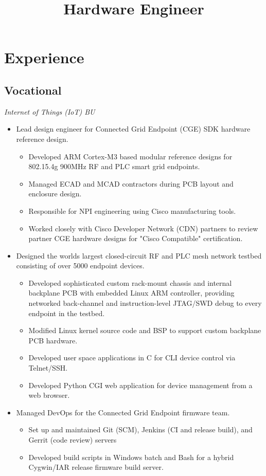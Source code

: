 \documentclass[11pt,a4paper]{moderncv}
\title{Hardware Engineer}
\begin{document}
\makecvtitle

\section{Experience}
\subsection{Vocational}
{
  \textit{Internet of Things (IoT) BU}
  \begin{itemize}
  \item Lead design engineer for Connected Grid Endpoint (CGE) SDK hardware reference design.
    \begin{itemize}
      \item Developed ARM Cortex-M3 based modular reference designs for 802.15.4g 900MHz RF and PLC smart grid endpoints.
      \item Managed ECAD and MCAD contractors during PCB layout and enclosure design.
      \item Responsible for NPI engineering using Cisco manufacturing tools.
      \item Worked closely with Cisco Developer Network (CDN) partners to review partner CGE hardware designs for "Cisco Compatible" certification.
    \end{itemize}
  \item Designed the worlds largest closed-circuit RF and PLC mesh network testbed consisting of over 5000 endpoint devices.
    \begin{itemize}
    \item Developed sophisticated custom rack-mount chassis and internal backplane PCB with embedded Linux ARM controller, providing networked back-channel and instruction-level JTAG/SWD debug to every endpoint in the testbed.
    \item Modified Linux kernel source code and BSP to support custom backplane PCB hardware.
    \item Developed user space applications in C for CLI device control via Telnet/SSH.
    \item Developed Python CGI web application for device management from a web browser.
    \end{itemize}
  \item Managed DevOps for the Connected Grid Endpoint firmware team.
    \begin{itemize}
    \item Set up and maintained Git (SCM), Jenkins (CI and release build), and Gerrit (code review) servers
    \item Developed build scripts in Windows batch and Bash for a hybrid Cygwin/IAR release firmware build server.
    \end{itemize}
  \end{itemize}
}
\end{document}
